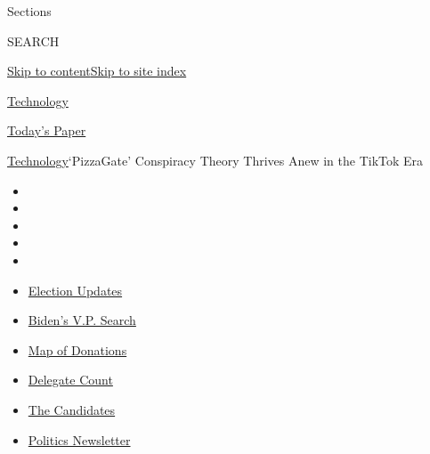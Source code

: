 Sections

SEARCH

\protect\hyperlink{site-content}{Skip to
content}\protect\hyperlink{site-index}{Skip to site index}

\href{https://www.nytimes.com/section/technology}{Technology}

\href{https://myaccount.nytimes.com/auth/login?response_type=cookie\&client_id=vi}{}

\href{https://www.nytimes.com/section/todayspaper}{Today's Paper}

\href{/section/technology}{Technology}\textbar{}`PizzaGate' Conspiracy
Theory Thrives Anew in the TikTok Era

\begin{itemize}
\item
\item
\item
\item
\item
\end{itemize}

\begin{itemize}
\item
  \href{https://www.nytimes.com/2020/07/31/us/elections/biden-vs-trump.html?action=click\&pgtype=Article\&state=default\&region=TOP_BANNER\&context=storylines_menu}{Election
  Updates}
\item
  \href{https://www.nytimes.com/article/biden-vice-president-2020.html?action=click\&pgtype=Article\&state=default\&region=TOP_BANNER\&context=storylines_menu}{Biden's
  V.P. Search}
\item
  \href{https://www.nytimes.com/interactive/2020/07/24/us/politics/trump-biden-campaign-donors.html?action=click\&pgtype=Article\&state=default\&region=TOP_BANNER\&context=storylines_menu}{Map
  of Donations}
\item
  \href{https://www.nytimes.com/interactive/2020/us/elections/delegate-count-primary-results.html?action=click\&pgtype=Article\&state=default\&region=TOP_BANNER\&context=storylines_menu}{Delegate
  Count}
\item
  \href{https://www.nytimes.com/interactive/2019/us/politics/2020-presidential-candidates.html?action=click\&pgtype=Article\&state=default\&region=TOP_BANNER\&context=storylines_menu}{The
  Candidates}
\item
  \href{https://www.nytimes.com/newsletters/politics?action=click\&pgtype=Article\&state=default\&region=TOP_BANNER\&context=storylines_menu}{Politics
  Newsletter}
\end{itemize}

